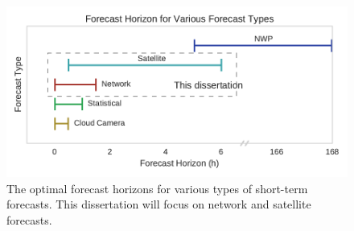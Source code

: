 \begin{figure}[h]
\hspace{-.5em}
\end{figure}


\begin{figure}[h]
\includegraphics[width=\textwidth]{figs/fxhoriz.pdf}
\caption[Forecast horizon for various forecast types]{The optimal
  forecast horizons for various types of short-term forecasts. This
  dissertation will focus on network and satellite forecasts.}
\label{fig:fxhoriz}
\end{figure}


